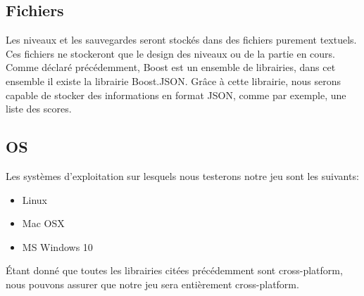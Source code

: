\subsection{Fichiers}
Les niveaux et les sauvegardes seront stockés dans des fichiers purement textuels. Ces fichiers ne stockeront que le design des niveaux ou de la partie en cours.
Comme déclaré précédemment, Boost est un ensemble de librairies, dans cet ensemble il existe la librairie Boost.JSON. Grâce à cette librairie, nous serons capable de stocker des informations en format JSON, comme par exemple, une liste des scores.

\subsection{OS}
Les systèmes d'exploitation sur lesquels nous testerons notre jeu sont les suivants:
\begin{itemize}
	\item Linux
	\item Mac OSX
	\item MS Windows 10
\end{itemize}
Étant donné que toutes les librairies citées précédemment sont cross-platform, nous pouvons assurer que notre jeu sera entièrement cross-platform.
